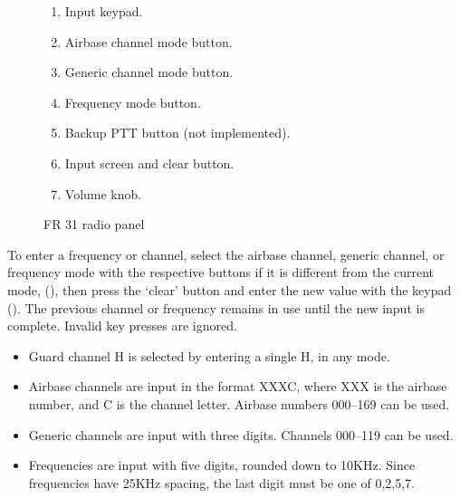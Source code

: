 \documentclass[a4paper]{report}
\begin{document}
{\begin{figure}[h]
    \begin{enumerate}[nosep]
      \item \label{item:keypad} Input keypad.
      \item \label{item:base} Airbase channel mode button.
      \item \label{item:nr} Generic channel mode button.
      \item \label{item:mhz} Frequency mode button.
      \item \label{item:base} Backup PTT button (not implemented).
      \item \label{item:screen} Input screen and clear button.
      \item \label{item:vol} Volume knob.
    \end{enumerate}
    \caption{FR 31 radio panel}
    \label{fig:fr31}
  \end{figure}
  To enter a frequency or channel, select the airbase channel, generic
  channel, or frequency mode with the respective buttons if it is different
  from the current mode, (),
  then press the `clear' button and enter the new value with the keypad ().
  The previous channel or frequency remains in use until the new input is complete.
  Invalid key presses are ignored.
  \begin{itemize}[noitemsep]
    \item Guard channel H is selected by entering a single H, in any mode.
    \item Airbase channels are input in the format XXXC,
      where XXX is the airbase number, and C is the channel letter.
      Airbase numbers 000--169 can be used.
    \item Generic channels are input with three digits. Channels 000--119 can be used.
    \item Frequencies are input with five digits, rounded down to 10KHz.
      Since frequencies have 25KHz spacing, the last digit must be one of 0,2,5,7.
  \end{itemize}
}
\end{document}
